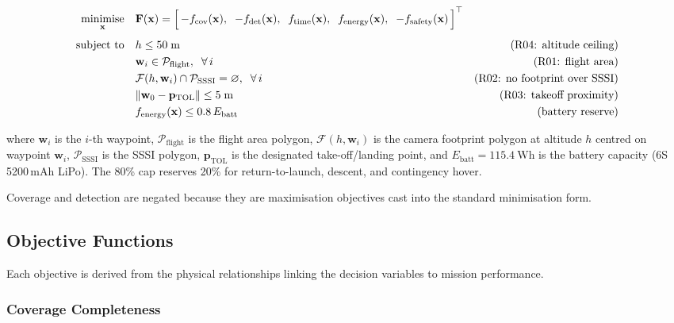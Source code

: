 \begin{equation}\label{eq:moo}
  \begin{aligned}
    \underset{\mathbf{x}}{\text{minimise}} \quad & \mathbf{F}(\mathbf{x}) = \Bigl[\, -f_{\mathrm{cov}}(\mathbf{x}),\;\; -f_{\mathrm{det}}(\mathbf{x}),\;\; f_{\mathrm{time}}(\mathbf{x}),\;\; f_{\mathrm{energy}}(\mathbf{x}),\;\; -f_{\mathrm{safety}}(\mathbf{x}) \,\Bigr]^\top \\[4pt]
    \text{subject to} \quad
      & h \leq 50 \;\text{m} & \text{(R04: altitude ceiling)} \\
      & \mathbf{w}_i \in \mathcal{P}_{\mathrm{flight}}, \;\; \forall\, i & \text{(R01: flight area)} \\
      & \mathcal{F}(h, \mathbf{w}_i) \cap \mathcal{P}_{\mathrm{SSSI}} = \varnothing, \;\; \forall\, i & \text{(R02: no footprint over SSSI)} \\
      & \lVert \mathbf{w}_0 - \mathbf{p}_{\mathrm{TOL}} \rVert \leq 5 \;\text{m} & \text{(R03: takeoff proximity)} \\
      & f_{\mathrm{energy}}(\mathbf{x}) \leq 0.8 \, E_{\mathrm{batt}} & \text{(battery reserve)}
  \end{aligned}
\end{equation}

\noindent where $\mathbf{w}_i$ is the $i$-th waypoint, $\mathcal{P}_{\mathrm{flight}}$ is the flight area polygon, $\mathcal{F}(h, \mathbf{w}_i)$ is the camera footprint polygon at altitude $h$ centred on waypoint $\mathbf{w}_i$, $\mathcal{P}_{\mathrm{SSSI}}$ is the SSSI polygon, $\mathbf{p}_{\mathrm{TOL}}$ is the designated take-off/landing point, and $E_{\mathrm{batt}} = \SI{115.4}{\watt\hour}$ is the battery capacity (6S 5200\,mAh LiPo). The 80\% cap reserves 20\% for return-to-launch, descent, and contingency hover.

Coverage and detection are negated because they are maximisation objectives cast into the standard minimisation form.

\subsection{Objective Functions}\label{sec:objectives}

Each objective is derived from the physical relationships linking the decision variables to mission performance.

\subsubsection{Coverage Completeness}\label{sec:obj-coverage}

